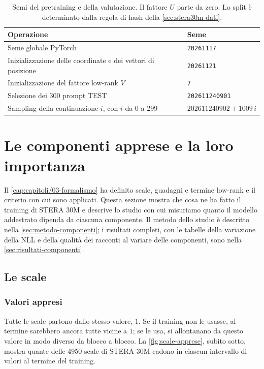 \begin{table}[H]
\centering
\small
\begin{tabularx}{\linewidth}{Xl}
\toprule
Operazione & Seme \\
\midrule
Seme globale PyTorch & \texttt{20261117} \\
Inizializzazione delle coordinate e dei vettori di posizione & \texttt{20261121} \\
Inizializzazione del fattore low-rank $V$ & \texttt{7} \\
Selezione dei 300 prompt TEST & \texttt{202611240901} \\
Sampling della continuazione $i$, con $i$ da 0 a 299 & $202611240902+1009\,i$ \\
\bottomrule
\end{tabularx}
\caption{Semi del pretraining e della valutazione. Il fattore $U$ parte da zero. Lo split è determinato dalla regola di hash della \autoref{sec:stera30m-dati}.}
\label{tab:stera30m-seed}
\end{table}



\section{Le componenti apprese e la loro importanza}
\label{sec:componenti-apprese}

Il \autoref{cap:capitoli/03-formalismo} ha definito scale, guadagni e termine low-rank e il criterio con cui sono applicati. Questa sezione mostra che cosa ne ha fatto il training di STERA 30M e descrive lo studio con cui misuriamo quanto il modello addestrato dipenda da ciascuna componente. Il metodo dello studio è descritto nella \autoref{sec:metodo-componenti}; i risultati completi, con le tabelle della variazione della NLL e della qualità dei racconti al variare delle componenti, sono nella \autoref{sec:risultati-componenti}.

\subsection{Le scale}

\subsubsection{Valori appresi}
Tutte le scale partono dallo stesso valore, $1$. Se il training non le usasse, al termine sarebbero ancora tutte vicine a $1$; se le usa, si allontanano da questo valore in modo diverso da blocco a blocco. La \autoref{fig:scale-apprese}, subito sotto, mostra quante delle \num{4950} scale di STERA 30M cadono in ciascun intervallo di valori al termine del training.

